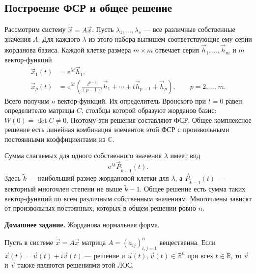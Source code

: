 \documentclass[12pt,a4paper]{article}
\numberwithin{equation}{section}
\newcommand{\R}{\mathbb{R}}
\newcommand{\vect}[1]{\vec{#1}}
\newcommand{\e}{\mathrm{e}}
\begin{document}
\subsection{Построение ФСР и общее решение}

\begin{theoremHSE}
Рассмотрим систему $\dot{\vect x}=A\vect x$.
Пусть $\lambda_1,\ldots,\lambda_s$ --- все различные собственные значения $A$.
Для каждого $\lambda$ из этого набора выпишем соответствующие ему серии
жорданова базиса. Каждой клетке размера $m\times m$ отвечает серия
$\vect h_1,\ldots,\vect h_m$ и $m$ вектор-функций
\[
 \begin{aligned}
 \vect x_1(t)&=\e^{\lambda t}\vect h_1,\\
 \vect x_p(t)&=\e^{\lambda t}
  \left(\frac{t^{p-1}}{(p-1)!}\vect h_1+\cdots+t\vect h_{p-1}+\vect h_p\right),
  \qquad p=2,\ldots,m.
 \end{aligned}
\]
Всего получим $n$ вектор-функций. Их определитель Вронского при $t=0$
равен определителю матрицы $C$, столбцы которой образуют жорданов базис:
$W(0)=\det C\ne0$. Поэтому эти решения составляют ФСР.
Общее комплексное решение есть линейная комбинация элементов этой ФСР
с произвольными постоянными коэффициентами из $\mathbb C$.
\end{theoremHSE}

Сумма слагаемых для одного собственного значения $\lambda$ имеет вид
\[
 \e^{\lambda t}\vect P_{\widetilde k-1}(t).
\]
Здесь $\widetilde k$ --- наибольший размер жордановой клетки для $\lambda$,
а $\vect P_{\widetilde k-1}(t)$ --- векторный многочлен степени не выше
$\widetilde k-1$. Общее решение есть сумма таких вектор-функций по всем
различным собственным значениям. Многочлены зависят от произвольных
постоянных, которых в общем решении ровно $n$.

\noindent\textbf{Домашнее задание.} Жорданова нормальная форма.

\begin{theoremHSE}
Пусть в системе \(\dot{\vect x}=A\vect x\) матрица
\(A=(a_{ij})_{i,j=1}^n\) вещественна. Если
\(\vect x(t)=\vect u(t)+i\vect v(t)\) --- решение и
\(\vect u(t),\vect v(t)\in\R^n\) при всех \(t\in\R\), то
\(\vect u\) и \(\vect v\) также являются решениями этой ЛОС.
\end{theoremHSE}
\end{document}
